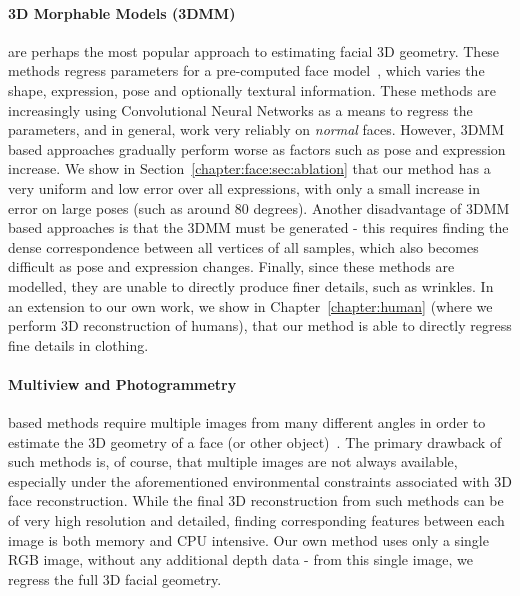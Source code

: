 \paragraph{3D Morphable Models (3DMM)} are perhaps the most popular
approach to estimating facial 3D geometry. These methods regress
parameters for a pre-computed face
model~\cite{jourabloo2016large,huber2016multiresolution,zhu2016face,liu2016joint},
which varies the shape, expression, pose and optionally textural
information. These methods are increasingly using Convolutional Neural
Networks as a means to regress the parameters, and in general, work
very reliably on \textit{normal} faces. However, 3DMM based approaches
gradually perform worse as factors such as pose and expression
increase. We show in Section~\ref{chapter:face:sec:ablation} that our
method has a very uniform and low error over all expressions, with
only a small increase in error on large poses (such as around 80
degrees). Another disadvantage of 3DMM based approaches is that the
3DMM must be generated - this requires finding the dense
correspondence between all vertices of all samples, which also becomes
difficult as pose and expression changes. Finally, since these methods
are modelled, they are unable to directly produce finer details, such
as wrinkles. In an extension to our own work, we show
in Chapter~\ref{chapter:human} (where we perform 3D reconstruction of humans),
that our method is able to directly regress fine details in clothing.


\paragraph{Multiview and Photogrammetry} based methods require
multiple images from many different angles in order to estimate the 3D
geometry of a face (or other
object)~\cite{dou2018multi,dai2018coarse,Piotraschke_2016_CVPR,mayo20093d}. The
primary drawback of such methods is, of course, that multiple images
are not always available, especially under the aforementioned
environmental constraints associated with 3D face
reconstruction. While the final 3D reconstruction from such methods
can be of very high resolution and detailed, finding corresponding
features between each image is both memory and CPU intensive. Our own
method uses only a single RGB image, without any additional depth data
- from this single image, we regress the full 3D facial geometry.

